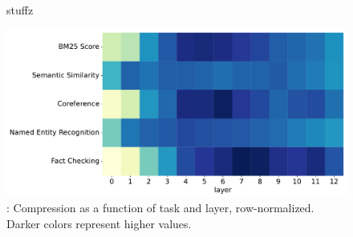 \begin{figure}

    \begin{subfigure}{\textwidth}
        \centering
    \end{subfigure}

    \begin{subfigure}{\textwidth}
        \centering
    \end{subfigure}

    \caption{stuffz}
\end{figure}


\begin{figure}
    \includegraphics[width=\textwidth]{gfx/probing/heatmap_compression_base}
    \caption{: Compression as a function of task and layer, row-normalized. Darker colors represent higher values.}
    \label{fig:heatmap_comp_base}
\end{figure}


